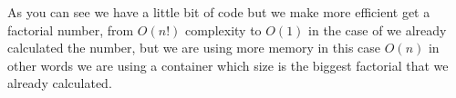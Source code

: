 As you can see we have a little bit of code but we make more efficient get a factorial number, from $O(n!)$ complexity to $O(1)$ in the case of we already calculated the number, but we are using more memory in this case $O(n)$ in other words we are using a container which size is the biggest factorial that we already calculated.